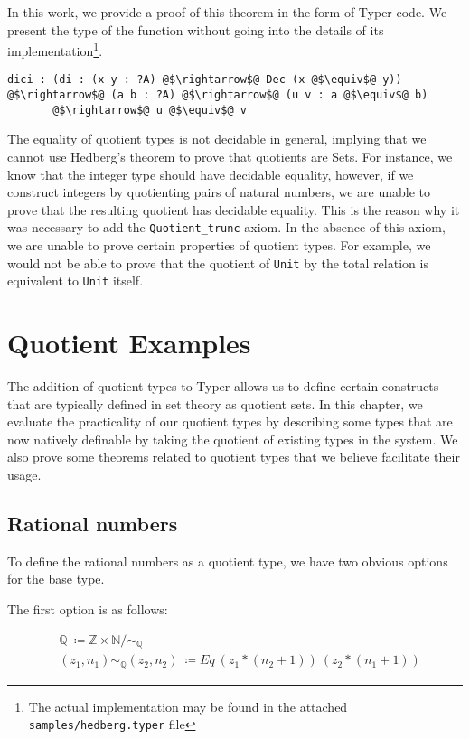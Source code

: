 \documentclass[12pt,twoside,maitrise]{dms}
\theoremstyle{definition}
\numberwithin{equation}{section}
\numberwithin{table}{chapter}
\numberwithin{figure}{chapter}
\newcommand\id[1] {\texttt{#1}}
\newcommand\fn[1] {\texttt{#1}}
\begin{document}
In this work, we provide a proof of this theorem in the form of Typer code. We
present the type of the function without going into the details of its
implementation\footnote{The actual implementation may be found in the attached \fn{samples/hedberg.typer} file}.

\begin{verbatim}
dici : (di : (x y : ?A) @$\rightarrow$@ Dec (x @$\equiv$@ y)) @$\rightarrow$@ (a b : ?A) @$\rightarrow$@ (u v : a @$\equiv$@ b)
       @$\rightarrow$@ u @$\equiv$@ v
\end{verbatim}

The equality of quotient types is not decidable in general, implying that we
cannot use Hedberg's theorem to prove that quotients are Sets. For instance, we
know that the integer type should have decidable equality, however, if we
construct integers by quotienting pairs of natural numbers, we are unable to
prove that the resulting quotient has decidable equality. This is the reason why
it was necessary to add the \id{Quotient\_trunc} axiom. In the absence of this
axiom, we are unable to prove certain properties of quotient types. For example,
we would not be able to prove that the quotient of \id{Unit} by the total
relation is equivalent to \id{Unit} itself\cite{vezzosi2021cubical}.

\chapter{Quotient Examples}\label{ch:quot-examples}
The addition of quotient types to Typer allows us to define certain constructs
that are typically defined in set theory as quotient sets. In this chapter, we
evaluate the practicality of our quotient types by describing some types that
are now natively definable by taking the quotient of existing types in the
system. We also prove some theorems related to quotient types that we believe
facilitate their usage.

\section{Rational numbers}
To define the rational numbers as a quotient type, we have two obvious options for the base type.

The first option is as follows:

\begin{align*}
  & \mathbb{Q} \ \coloneqq \mathbb{Z} \times \mathbb{N} / \sim_{\mathbb{Q}} \\
  & (z_1 , n_1) \sim_{\mathbb{Q}} (z_2 , n_2) \ \coloneqq Eq \ (z_1 * (n_2 + 1)) \ (z_2 * (n_1 + 1))
\end{align*}
\end{document}

